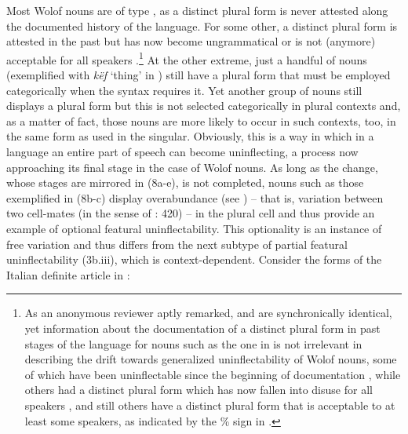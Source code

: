 \documentclass[output=paper]{langscibook}
\begin{document}
\begin{styleStandardoE}
Most Wolof nouns are of type , as a distinct plural form is never attested along the documented history of the language. For some other, a distinct plural form is attested in the past but has now become ungrammatical  or is not (anymore) acceptable for all speakers .\footnote{As an anonymous reviewer aptly remarked,  and  are synchronically identical, yet information about the documentation of a distinct plural form in past stages of the language for nouns such as the one in  is not irrelevant in describing the drift towards generalized uninflectability of Wolof nouns, some of which have been uninflectable since the beginning of documentation , while others had a distinct plural form which has now fallen into disuse for all speakers , and still others have a distinct plural form that is acceptable to at least some speakers, as indicated by the \% sign in .} At the other extreme, just a handful of nouns (exemplified with \textit{këf} ‘thing’ in ) still have a plural form that must be employed categorically when the syntax requires it. Yet another group of nouns  still displays a plural form but this is not selected categorically in plural contexts and, as a matter of fact, those nouns are more likely to occur in such contexts, too, in the same form as used in the singular. Obviously, this is a way in which in a language an entire part of speech can become uninflecting, a process now approaching its final stage in the case of Wolof nouns. As long as the change, whose stages are mirrored in (8a-e), is not completed, nouns such as those exemplified in (8b-c) display overabundance (see \citealt{Thornton2011}) – that is, variation between two cell-mates (in the sense of \citealt{LoporcaroPaciaroni2011}: 420) – in the plural cell and thus provide an example of optional featural uninflectability. This optionality is an instance of free variation and thus differs from the next subtype of partial featural uninflectability (3b.iii), which is context-dependent. Consider the forms of the Italian definite article in :
\end{styleStandardoE}
\end{document}
